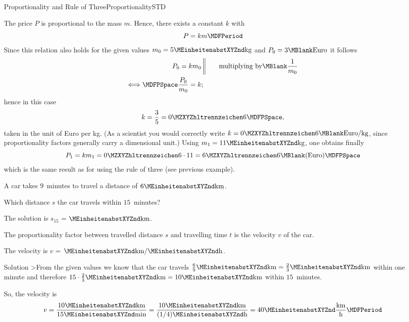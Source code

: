 \begin{MXContent}{Proportionality and Rule of Three}{Proportionality}{STD}
\begin{MExample}
The price $P$ is proportional to the mass $m$. Hence, there exists a constant 
$k$ with
$$
P=k m \MDFPeriod
$$
Since this relation also holds for the given values $m_0=5\MEinheit{kg}$
and $P_0=3\MBlank\text{Euro}$ it follows 
\begin{eqnarray*}
  P_0=k m_0 & \MTSP\MSep\MTSP & \text{multiplying by}\MBlank \frac{1}{m_0} \\
  \Longleftrightarrow\MDFPSpace\frac{P_0}{m_0}=k &;& 
\end{eqnarray*}
hence in this case
$$
k=\frac{3}{5} = \MZahl{0}{6} \MDFPSpace,
$$
taken in the unit of Euro per kg. (As a scientist you would correctly write 
 $k=\MZahl{0}{6} \MBlank \text{Euro}/\MEinheit[]{kg}$, since proportionality factors 
generally carry a dimensional unit.) Using $m_1=11\MEinheit{kg}$, one obtains 
finally
$$
P_1=k m_1 = \MZahl{0}{6}\cdot 11 =\MZahl{6}{6} \MBlank \text{(Euro)}
\MDFPSpace
$$
which is the same result as for using the rule of three (see previous example).
\end{MExample}

\begin{MExercise}
A car takes $9$~minutes to travel a distance of $6\MEinheit{km}$.
\begin{MExerciseItems}
\item{%
Which distance $s$ the car travels within $15$~minutes?
\medskip\par
The solution is $s_{15}$ = $\MEinheit{km}$.
}
\item{%
The proportionality factor between travelled distance $s$ and travelling 
time $t$ is the velocity $v$ of the car.
\medskip\par
The velocity is $v$ = $\MEinheit{km}/\MEinheit{h}$.
}
\end{MExerciseItems}
\begin{MHint}{Solution}
>From the given values we know that the car travels $\frac{6}{9}\MEinheit{km}
=\frac{2}{3}\MEinheit{km}$  within one minute and therefore 
$15\cdot\frac{2}{3}\MEinheit{km}=10\MEinheit{km}$ within $15$~minutes.
\par
So, the velocity is
$$v=\frac{10\MEinheit{km}}{15\MEinheit{min}} = 
\frac{10\MEinheit{km}}{(1/4)\MEinheit{h}} =
40\MEinheit{}\frac{\MEinheit[]{km}}{\MEinheit[]{h}}
\MDFPeriod
$$
\end{MHint}
\end{MExercise}
\end{MXContent}

